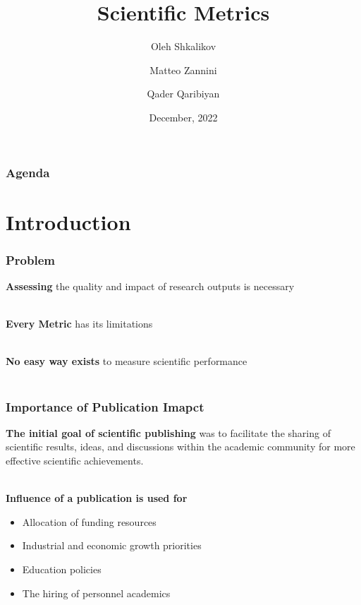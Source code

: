 \documentclass{beamer}
\title[Scientific metrics]{Scientific Metrics}
\author[O. Shkalikov \and M. Zannini \and Q.Qaribiyan]
{Oleh Shkalikov \and Matteo Zannini \and Qader Qaribiyan}
\institute[]{TU Dresden, Computer Science Faculty}
\date{December, 2022}
\begin{document}
\frame{\titlepage}

\begin{frame}
    \frametitle{Agenda}
    \tableofcontents
\end{frame}

\section{Introduction}
\begin{frame}

    \frametitle{Problem}

    \textbf{Assessing} the quality and impact of research outputs is necessary \\~\

    \textbf{Every Metric} has its limitations\\~\

    \textbf{No easy way exists} to measure scientific performance\\~\

\end{frame}
\begin{frame}

    \frametitle{Importance of Publication Imapct}

    \textbf{The initial goal of scientific publishing} was to facilitate the sharing of scientific results, ideas, and discussions within the academic community for more effective scientific achievements. \\~\

    \textbf{Influence of a publication is used for}

    \begin{itemize}
        \item Allocation of funding resources
        \item Industrial and economic growth priorities
        \item Education policies
        \item The hiring of personnel academics
    \end{itemize}

\end{frame}
\end{document}
